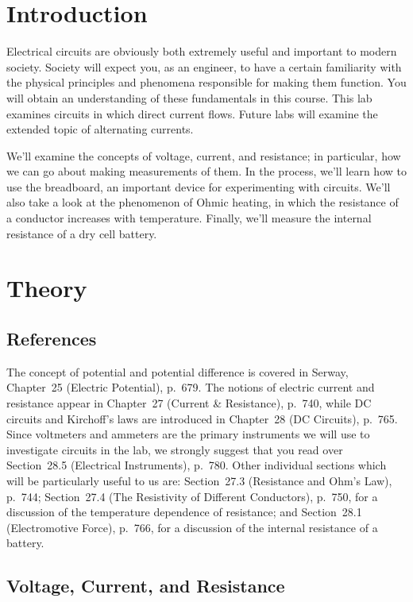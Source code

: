 \section{Introduction}

Electrical circuits are obviously both extremely useful and important to
modern society.  Society will expect you, as an engineer, to have a certain 
familiarity with the physical principles and phenomena responsible for making 
them function. You will obtain an understanding of these fundamentals in this 
course.  This lab examines circuits in which direct current flows. Future labs 
will examine the extended topic of alternating currents. 
  
We'll examine the concepts of voltage, current, and resistance; in particular,
how we can go about making measurements of them. In the process, we'll learn 
how to use the breadboard, an important device for experimenting with circuits.
We'll also take a look at the phenomenon of Ohmic heating, in which the 
resistance of a conductor increases with temperature.  Finally, we'll measure 
the internal resistance of a dry cell battery.

\section{Theory}

\subsection{References}

The concept of potential and potential difference is covered in Serway, 
Chapter~25 (Electric Potential), p.~679.  The notions of electric current and 
resistance appear in Chapter~27 (Current \& Resistance), p.~740, while DC 
circuits and Kirchoff's laws are introduced in Chapter~28 (DC Circuits), 
p.~765. Since voltmeters and ammeters are the primary instruments we will use
to investigate circuits in the lab, we strongly suggest that you read over 
Section~28.5 (Electrical Instruments), p.~780.  Other individual sections 
which will be particularly useful to us are: Section~27.3 (Resistance and 
Ohm's Law), p.~744; Section~27.4 (The Resistivity of Different Conductors), 
p.~750, for a discussion of the temperature dependence of resistance; and 
Section~28.1 (Electromotive Force), p.~766, for a discussion of the internal 
resistance of a battery. 
 
\subsection{Voltage, Current, and Resistance}


